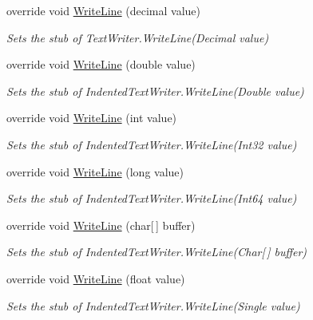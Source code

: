 \begin{DoxyCompactItemize}
override void \hyperlink{class_system_1_1_code_dom_1_1_compiler_1_1_fakes_1_1_stub_indented_text_writer_ab1ef29012702031cdb7bd1b719e3dd51}{Write\-Line} (decimal value)
\begin{DoxyCompactList}\small\item\em Sets the stub of Text\-Writer.\-Write\-Line(\-Decimal value)\end{DoxyCompactList}\item 
override void \hyperlink{class_system_1_1_code_dom_1_1_compiler_1_1_fakes_1_1_stub_indented_text_writer_acfbb55f75539bb9298e637dc5a7b3473}{Write\-Line} (double value)
\begin{DoxyCompactList}\small\item\em Sets the stub of Indented\-Text\-Writer.\-Write\-Line(\-Double value)\end{DoxyCompactList}\item 
override void \hyperlink{class_system_1_1_code_dom_1_1_compiler_1_1_fakes_1_1_stub_indented_text_writer_a839604b5963ef834942f1eafb613225a}{Write\-Line} (int value)
\begin{DoxyCompactList}\small\item\em Sets the stub of Indented\-Text\-Writer.\-Write\-Line(\-Int32 value)\end{DoxyCompactList}\item 
override void \hyperlink{class_system_1_1_code_dom_1_1_compiler_1_1_fakes_1_1_stub_indented_text_writer_a3c79ded4cc0bace5cd8722f23b34e273}{Write\-Line} (long value)
\begin{DoxyCompactList}\small\item\em Sets the stub of Indented\-Text\-Writer.\-Write\-Line(\-Int64 value)\end{DoxyCompactList}\item 
override void \hyperlink{class_system_1_1_code_dom_1_1_compiler_1_1_fakes_1_1_stub_indented_text_writer_a45c3e73bbe07e875059260f8471fb467}{Write\-Line} (char\mbox{[}$\,$\mbox{]} buffer)
\begin{DoxyCompactList}\small\item\em Sets the stub of Indented\-Text\-Writer.\-Write\-Line(\-Char\mbox{[}$\,$\mbox{]} buffer)\end{DoxyCompactList}\item 
override void \hyperlink{class_system_1_1_code_dom_1_1_compiler_1_1_fakes_1_1_stub_indented_text_writer_ac33b7fcf5cf17ecf74ba52337533b22d}{Write\-Line} (float value)
\begin{DoxyCompactList}\small\item\em Sets the stub of Indented\-Text\-Writer.\-Write\-Line(\-Single value)\end{DoxyCompactList}\item 

\end{DoxyCompactItemize}

